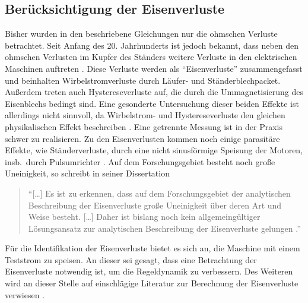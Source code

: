 \documentclass[conference,twocolumn]{IEEEtran}
\begin{document}
\subsection{Berücksichtigung der Eisenverluste}\label{sec:eisenverluste}
Bisher wurden in den beschriebene Gleichungen nur die ohmschen Verluste betrachtet.
Seit Anfang des 20. Jahrhunderts ist jedoch bekannt, dass neben den ohmschen Verlusten im Kupfer des Ständers weitere Verluste in den elektrischen Maschinen auftreten \autocites{reinert_calculation_2001}{stumberger_evaluation_2003}{kilthau_parameter-measurement_2001}{stumberger_evaluation_2003}.
Diese Verluste werden als \enquote{Eisenverluste} zusammengefasst und beinhalten Wirbelstromverluste durch Läufer- und Ständerblechpacket.
Außerdem treten auch Hystereseverluste auf, die durch die Ummagnetisierung des Eisenblechs bedingt sind.
Eine gesonderte Untersuchung dieser beiden Effekte ist allerdings nicht sinnvoll, da Wirbelstrom- und Hystereseverluste den gleichen physikalischen Effekt beschreiben \autocite{reinert_calculation_2001}.
Eine getrennte Messung ist in der Praxis schwer zu realisieren.
Zu den Eisenverlusten kommen noch einige parasitäre Effekte, wie Ständerverluste, durch eine nicht sinusförmige Speisung der Motoren, insb.\ durch Pulsumrichter \autocite{Kellner2012}.
Auf dem Forschungsgebiet besteht noch große Uneinigkeit, so schreibt \textcite{Kellner2012} in seiner Dissertation

\begin{quote}
\enquote{[\ldots] Es ist zu erkennen, dass auf dem Forschungsgebiet der analytischen Beschreibung
der Eisenverluste große Uneinigkeit über deren Art und Weise besteht. [\ldots] Daher ist bislang
noch kein allgemeingültiger Lösungsansatz zur analytischen Beschreibung der
Eisenverluste gelungen \autocite[S.~65]{Kellner2012}.} 
\end{quote}

Für die Identifikation der Eisenverluste bietet es sich an, die Maschine mit einem Teststrom zu speisen.
An dieser sei gesagt, dass eine Betrachtung der Eisenverluste notwendig ist, um die Regeldynamik zu verbessern.
Des Weiteren wird an dieser Stelle auf einschlägige Literatur zur Berechnung der Eisenverluste verwiesen \autocites{Kellner2012}{reinert_calculation_2001}{stumberger_evaluation_2003}.
\end{document}
